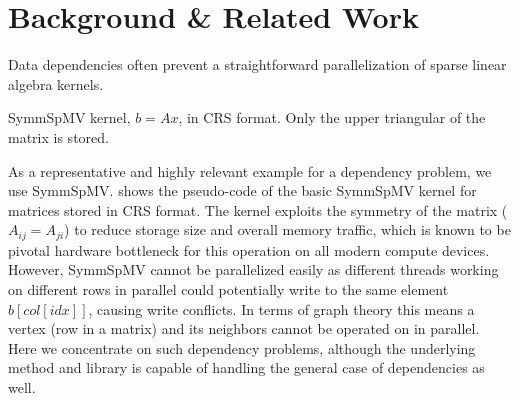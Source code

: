 \section{Background \& Related Work} \label{sec:background}
Data dependencies often prevent a straightforward parallelization of sparse linear algebra kernels.
\begin{algorithm}[b]
	\caption{\label{alg:symmSpMV} \acrshort{SymmSpMV} kernel,  $b=Ax$, in \acrshort{CRS} format. Only the upper triangular of the matrix is stored.}
	\begin{algorithmic}[1]
		\Statex{\textcolor{darkgray} {//Loop over all matrix rows}}
			\Statex{\hspace{1.5em} \textcolor{darkgray} {//Loop over all non-zero entries in a row}}
			\EndFor
		\EndFor
	\end{algorithmic}
\end{algorithm}
As a representative and highly relevant example for a \DTWO dependency problem, we use \acrfull{SymmSpMV}. 
 shows the pseudo-code of the basic \acrshort{SymmSpMV} kernel 
for matrices stored in \acrfull{CRS} \cite{CRS} format. The kernel exploits the symmetry
of the matrix ($A_{ij} = A_{ji}$) to reduce storage size and overall 
memory traffic, which is known to be pivotal hardware bottleneck for this operation on all modern compute devices.  
However, \acrshort{SymmSpMV} cannot be parallelized easily as 
different threads working on different rows in parallel could potentially 
write to the same element $b[col[idx]]$,
causing write conflicts.
In terms of graph theory this means a vertex (row in a matrix) and 
its \DTWO neighbors \cite{dist_k_def} cannot be operated on in parallel.
Here we concentrate on such \DTWO dependency problems, although 
the underlying method and library is capable of handling 
the general case of \DK dependencies as well.


